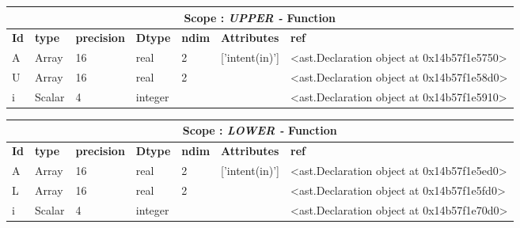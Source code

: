 \documentclass{report}
\begin{document}
\begin{center}
\begin{longtable}{|p{3.5cm}|p{1.5cm}|p{1.5cm}|p{1.5cm}|p{1cm}|p{2cm}|p{4cm}| }
\hline
\multicolumn{7}{|c|}{\textbf{Scope : \qquad}  \textbf{\textit{UPPER - }Function}}\\ 
\hline
\textbf{Id} & \textbf{type} & \textbf{precision} & \textbf{Dtype} & \textbf{ndim} & \textbf{Attributes} & \textbf{ref} \\\hline

A & Array & 16 & real & 2 & ['intent(in)'] & <ast.Declaration object at 0x14b57f1e5750> \\\hline

U & Array & 16 & real & 2 &  & <ast.Declaration object at 0x14b57f1e58d0> \\\hline

i & Scalar & 4 & integer &  &  & <ast.Declaration object at 0x14b57f1e5910> \\\hline

\end{longtable}
\end{center}

 \vspace{1cm}

\begin{center}
\begin{longtable}{|p{3.5cm}|p{1.5cm}|p{1.5cm}|p{1.5cm}|p{1cm}|p{2cm}|p{4cm}| }
\hline
\multicolumn{7}{|c|}{\textbf{Scope : \qquad}  \textbf{\textit{LOWER - }Function}}\\ 
\hline
\textbf{Id} & \textbf{type} & \textbf{precision} & \textbf{Dtype} & \textbf{ndim} & \textbf{Attributes} & \textbf{ref} \\\hline

A & Array & 16 & real & 2 & ['intent(in)'] & <ast.Declaration object at 0x14b57f1e5ed0> \\\hline

L & Array & 16 & real & 2 &  & <ast.Declaration object at 0x14b57f1e5fd0> \\\hline

i & Scalar & 4 & integer &  &  & <ast.Declaration object at 0x14b57f1e70d0> \\\hline

\end{longtable}
\end{center}

 \vspace{1cm}
\end{document}
